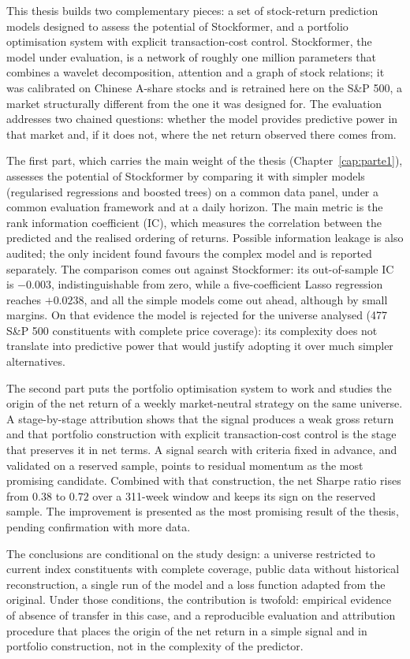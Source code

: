 This thesis builds two complementary pieces: a set of stock-return prediction models
designed to assess the potential of Stockformer, and a portfolio optimisation system with
explicit transaction-cost control. Stockformer, the model under evaluation, is a network
of roughly one million parameters that combines a wavelet decomposition, attention and a
graph of stock relations; it was calibrated on Chinese A-share stocks and is retrained
here on the S\&P 500, a market structurally different from the one it was designed for.
The evaluation addresses two chained questions: whether the model provides predictive
power in that market and, if it does not, where the net return observed there comes from.

The first part, which carries the main weight of the thesis
(Chapter~\ref{cap:parte1}), assesses the potential of Stockformer by comparing it with
simpler models (regularised regressions and boosted trees) on a common data panel, under
a common evaluation framework and at a daily horizon. The main metric is the rank
information coefficient (IC), which measures the correlation between the predicted and
the realised ordering of returns. Possible information leakage is also audited; the only
incident found favours the complex model and is reported separately. The comparison comes
out against Stockformer: its out-of-sample IC is $-0.003$, indistinguishable from zero,
while a five-coefficient Lasso regression reaches $+0.0238$, and all the simple models
come out ahead, although by small margins. On that evidence the model is rejected for the
universe analysed (477 S\&P 500 constituents with complete price coverage): its
complexity does not translate into predictive power that would justify adopting it over
much simpler alternatives.

The second part puts the portfolio optimisation system to work and studies the origin of
the net return of a weekly market-neutral strategy on the same universe. A stage-by-stage attribution shows that the signal produces a weak
gross return and that portfolio construction with explicit transaction-cost control is the
stage that preserves it in net terms. A signal search with criteria fixed in advance, and
validated on a reserved sample, points to residual momentum as the most promising
candidate. Combined with that construction, the net Sharpe ratio rises from $0.38$ to
$0.72$ over a 311-week window and keeps its sign on the reserved sample. The improvement
is presented as the most promising result of the thesis, pending confirmation with more
data.

The conclusions are conditional on the study design: a universe restricted to current
index constituents with complete coverage, public data without historical reconstruction,
a single run of the model and a loss function adapted from the original. Under those
conditions, the contribution is twofold: empirical evidence of absence of transfer in this
case, and a reproducible evaluation and attribution procedure that places the origin of
the net return in a simple signal and in portfolio construction, not in the complexity of
the predictor.